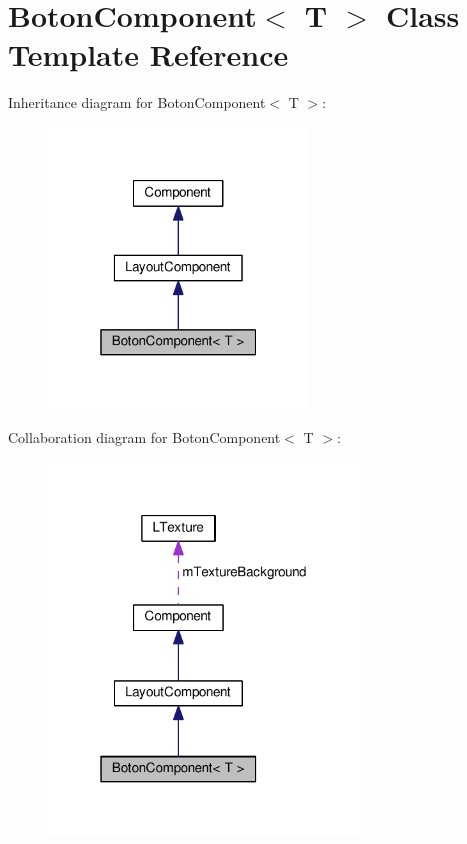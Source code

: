 \hypertarget{class_boton_component}{}\section{Boton\+Component$<$ T $>$ Class Template Reference}
\label{class_boton_component}


Inheritance diagram for Boton\+Component$<$ T $>$\+:\nopagebreak
\begin{figure}[H]
\begin{center}
\leavevmode
\includegraphics[width=196pt]{class_boton_component__inherit__graph}
\end{center}
\end{figure}


Collaboration diagram for Boton\+Component$<$ T $>$\+:\nopagebreak
\begin{figure}[H]
\begin{center}
\leavevmode
\includegraphics[width=235pt]{class_boton_component__coll__graph}
\end{center}
\end{figure}
